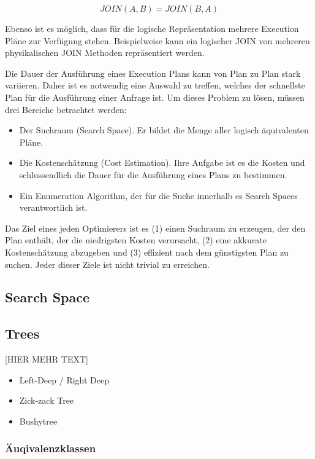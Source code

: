 $$ JOIN(A,B) = JOIN(B,A)$$

Ebenso ist es möglich, dass für die logische Repräsentation mehrere Execution Pläne zur Verfügung stehen. Beispielweise kann ein logischer JOIN von mehreren physikalischen JOIN Methoden repräsentiert werden.

Die Dauer der Ausführung eines Execution Plans kann von Plan zu Plan stark variieren. Daher ist es notwendig eine Auswahl zu treffen, welches der schnellste Plan für die Ausführung einer Anfrage ist. Um dieses Problem zu lösen, müssen drei Bereiche betrachtet werden:

\begin{itemize}
\item Der Suchraum (Search Space). Er bildet die Menge aller logisch äquivalenten Pläne.
\item Die Kostenschätzung (Cost Estimation). Ihre Aufgabe ist es die Kosten und schlussendlich die Dauer für die Ausführung eines Plans zu bestimmen.
\item Ein Enumeration Algorithm, der für die Suche innerhalb es Search Spaces verantwortlich ist.
\end{itemize}

Das Ziel eines jeden Optimierers ist es (1) einen Suchraum zu erzeugen, der den Plan enthält, der die niedrigsten Kosten verursacht, (2) eine akkurate Kostenschätzung abzugeben und (3) effizient nach dem günstigsten Plan zu suchen. Jeder dieser Ziele ist nicht trivial zu erreichen.



\subsection{Search Space}



\subsection{Trees}

[HIER MEHR TEXT]
\cite{ioannidis1991left}
\begin{itemize}
\item Left-Deep / Right Deep
\item Zick-zack Tree
\item Bushytree
\end{itemize}



\subsubsection{Äuqivalenzklassen}

